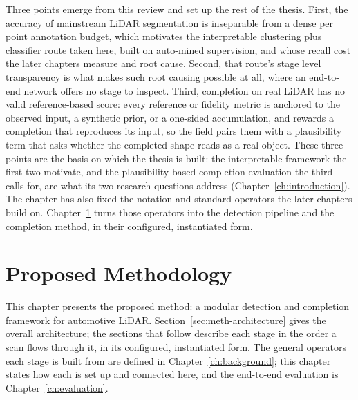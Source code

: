 \documentclass[a4paper,12pt]{report}
\begin{document}
Three points emerge from this review and set up the rest of the thesis. First, the accuracy
of mainstream LiDAR segmentation is inseparable from a dense per point annotation budget,
which motivates the interpretable clustering plus classifier route taken here, built on
auto-mined supervision, and whose recall cost the later chapters measure and root cause. Second, that
route's stage level transparency is what makes such root causing possible at all, where an
end-to-end network offers no stage to inspect. Third, completion on real LiDAR has no valid
reference-based score: every reference or fidelity metric is anchored to the observed input,
a synthetic prior, or a one-sided accumulation, and rewards a completion that reproduces its
input, so the field pairs them with a plausibility term that asks whether the completed
shape reads as a real object. These three points are the basis on which the thesis is built:
the interpretable framework the first two motivate, and the plausibility-based completion
evaluation the third calls for, are what its two research questions address
(Chapter~\ref{ch:introduction}). The chapter has also fixed the notation and standard
operators the later chapters build on. Chapter~\ref{ch:pipeline} turns those operators into
the detection pipeline and the completion method, in their configured, instantiated form.
%
%
\chapter{Proposed Methodology}
\label{ch:pipeline}

This chapter presents the proposed method: a modular detection and completion framework
for automotive LiDAR. Section~\ref{sec:meth-architecture} gives the overall architecture;
the sections that follow describe each stage in the order a scan flows through it, in its
configured, instantiated form. The general operators each stage is built from are defined
in Chapter~\ref{ch:background}; this chapter states how each is set up and connected here,
and the end-to-end evaluation is Chapter~\ref{ch:evaluation}.
\end{document}
